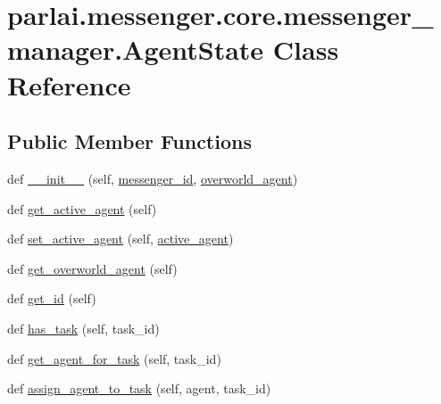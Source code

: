 \hypertarget{classparlai_1_1messenger_1_1core_1_1messenger__manager_1_1AgentState}{}\section{parlai.\+messenger.\+core.\+messenger\+\_\+manager.\+Agent\+State Class Reference}
\label{classparlai_1_1messenger_1_1core_1_1messenger__manager_1_1AgentState}
\subsection*{Public Member Functions}
\begin{DoxyCompactItemize}
\item 
def \hyperlink{classparlai_1_1messenger_1_1core_1_1messenger__manager_1_1AgentState_a059cfffdf61335710a6cfecd2d360971}{\+\_\+\+\_\+init\+\_\+\+\_\+} (self, \hyperlink{classparlai_1_1messenger_1_1core_1_1messenger__manager_1_1AgentState_a5884d2d96a937f7bebd7211e8156e2ff}{messenger\+\_\+id}, \hyperlink{classparlai_1_1messenger_1_1core_1_1messenger__manager_1_1AgentState_a0c52c5785d252ddcbd2c94c51e369318}{overworld\+\_\+agent})
\item 
def \hyperlink{classparlai_1_1messenger_1_1core_1_1messenger__manager_1_1AgentState_a0c664dbebb50b628f31626a8de0c5d7b}{get\+\_\+active\+\_\+agent} (self)
\item 
def \hyperlink{classparlai_1_1messenger_1_1core_1_1messenger__manager_1_1AgentState_aad23c5c7b3c908f385b93581255662fb}{set\+\_\+active\+\_\+agent} (self, \hyperlink{classparlai_1_1messenger_1_1core_1_1messenger__manager_1_1AgentState_a1eaece0dcaec5dbb4150e238ea6fd543}{active\+\_\+agent})
\item 
def \hyperlink{classparlai_1_1messenger_1_1core_1_1messenger__manager_1_1AgentState_a40c9b4e3bc2873d6754c5bd3dc2fb547}{get\+\_\+overworld\+\_\+agent} (self)
\item 
def \hyperlink{classparlai_1_1messenger_1_1core_1_1messenger__manager_1_1AgentState_aeb63554d836d69a6f829a67b7103f292}{get\+\_\+id} (self)
\item 
def \hyperlink{classparlai_1_1messenger_1_1core_1_1messenger__manager_1_1AgentState_af642027e7465f3c99e4000c0eeb9292c}{has\+\_\+task} (self, task\+\_\+id)
\item 
def \hyperlink{classparlai_1_1messenger_1_1core_1_1messenger__manager_1_1AgentState_ac4c971108af734b4936ebcbc9f56fa34}{get\+\_\+agent\+\_\+for\+\_\+task} (self, task\+\_\+id)
\item 
def \hyperlink{classparlai_1_1messenger_1_1core_1_1messenger__manager_1_1AgentState_af5d5fb350629667f893337d4043143af}{assign\+\_\+agent\+\_\+to\+\_\+task} (self, agent, task\+\_\+id)
\end{DoxyCompactItemize}

